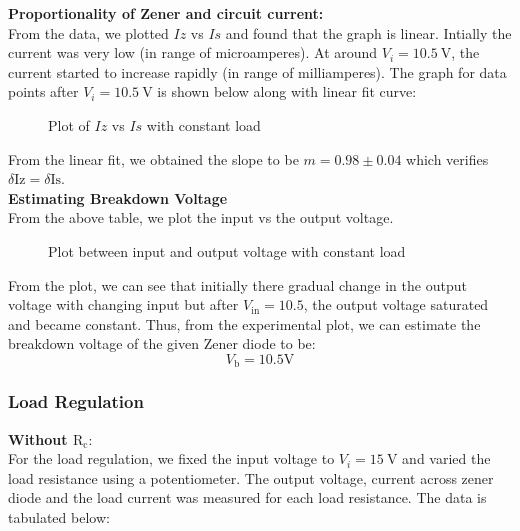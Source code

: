 \documentclass{scrartcl}
\begin{document}
\noindent
\textbf{Proportionality of Zener and circuit current:}\\[0.3cm]
From the data, we plotted $Iz$ vs $Is$ and found that the graph is linear. Intially the current was very low (in range of microamperes). At around $V_i = 10.5 \ \mathrm{V}$, the current started to increase rapidly (in range of milliamperes). The graph for data points after $V_i = 10.5 \ \mathrm{V}$ is shown below along with linear fit curve:
\begin{figure}[H]
        \centering
        
        \caption{Plot of $Iz$ vs $Is$ with constant load}
\end{figure}
\noindent
From the linear fit, we obtained the slope to be $m = 0.98\pm0.04$ which verifies $\delta \mathrm{Iz} = \delta \mathrm{Is}$.\\[0.3cm]
\textbf{Estimating Breakdown Voltage}\\[0.3cm]
From the above table, we plot the input vs the output voltage. 
\begin{figure}[H]
        \centering
        
        \caption{Plot between input and output voltage with constant load}
\end{figure}
\noindent
From the plot, we can see that initially there gradual change in the output voltage with changing input but after $V_{\mathrm{in}} = 10.5$, the output voltage saturated and became constant. Thus, from the experimental plot, we can estimate the breakdown voltage of the given Zener diode to be:
$$\boxed{V_\mathrm{b} = 10.5 \mathrm{V}}$$
\subsubsection{Load Regulation}
\textbf{Without $\mathrm{R_c}:$ }\\[0.3cm]
For the load regulation, we fixed the input voltage to $V_i = 15 \ \mathrm{V}$ and varied the load resistance using a potentiometer. The output voltage, current across zener diode and the load current was measured for each load resistance. The data is tabulated below:
\end{document}
